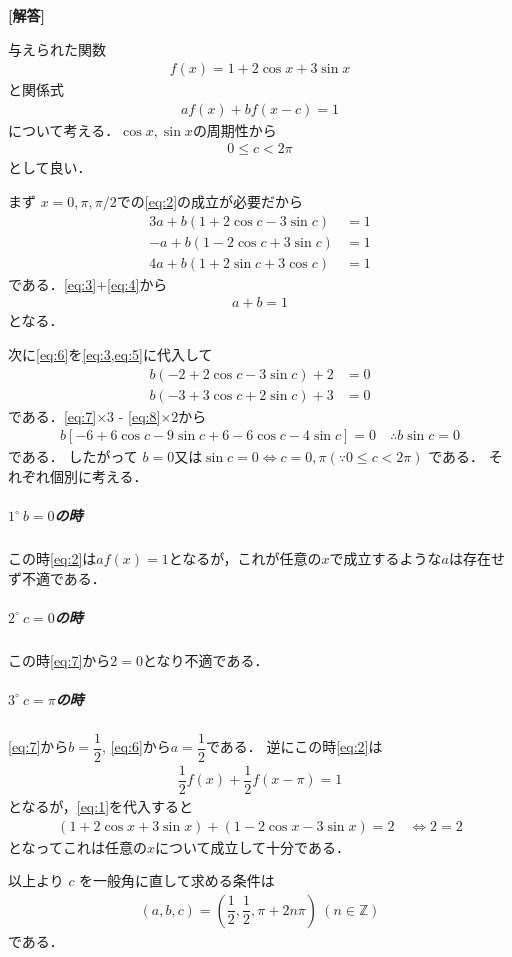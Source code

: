 \documentclass[../../main.tex]{subfiles}
\begin{document}
\begin{oframed}
  
\end{oframed}

{\bf [解答]}

与えられた関数
\begin{align}
  f(x) = 1 + 2\cos x + 3\sin x \label{eq:1}
\end{align}
と関係式
\begin{align}
  af(x) + bf(x-c) = 1 \label{eq:2}
\end{align}
について考える．$\cos x, \sin x$の周期性から
\begin{align}
  0 \le c < 2\pi
\end{align}
として良い．

まず $x=0, \pi, \pi/2$での\cref{eq:2}の成立が必要だから
\begin{align}
  3a + b(1+2\cos c - 3\sin c) &= 1 \label{eq:3} \\
  -a + b(1-2\cos c + 3\sin c) &= 1 \label{eq:4} \\
  4a + b(1+2\sin c + 3\cos c) &= 1 \label{eq:5}
\end{align}
である．\cref{eq:3}+\cref{eq:4}から
\begin{align}
  a + b = 1 \label{eq:6}
\end{align}
となる．

次に\cref{eq:6}を\cref{eq:3,eq:5}に代入して
\begin{align}
  b(-2 + 2\cos c - 3\sin c) + 2 &= 0 \label{eq:7} \\
  b(-3 + 3\cos c + 2\sin c) + 3 &= 0 \label{eq:8}
\end{align}
である．\cref{eq:7}$\times 3$ - \cref{eq:8}$\times 2$から
\begin{align}
  b[-6 + 6\cos c - 9\sin c + 6 - 6\cos c - 4\sin c] = 0
  \quad \therefore
  b \sin c = 0
\end{align}
である．
したがって $b=0$又は$\sin c=0 \iff c=0, \pi (\because 0 \le c < 2\pi)$ である．
それぞれ個別に考える．

\subparagraph{$1^\circ \ b=0$の時}

この時\cref{eq:2}は$af(x)=1$となるが，これが任意の$x$で成立するような$a$は存在せず不適である．

\subparagraph{$2^\circ \ c=0$の時}

この時\cref{eq:7}から$2=0$となり不適である．

\subparagraph{$3^\circ \ c=\pi$の時}

\cref{eq:7}から$b=\dfrac{1}{2}$, \cref{eq:6}から$a=\dfrac{1}{2}$である．
逆にこの時\cref{eq:2}は
\begin{align}
  \dfrac{1}{2}f(x) + \dfrac{1}{2}f(x-\pi) = 1
\end{align}
となるが，\cref{eq:1}を代入すると
\begin{align}
  (1+2\cos x + 3\sin x ) + (1-2\cos x - 3\sin x ) = 2
  \quad \iff
  2 = 2
\end{align}
となってこれは任意の$x$について成立して十分である．
\casesend

以上より $c$ を一般角に直して求める条件は
\begin{align}
  (a, b, c) = \left(\dfrac{1}{2}, \dfrac{1}{2}, \pi + 2n\pi\right) \ (n \in \mathbb{Z})
\end{align}
である．
\end{document}
